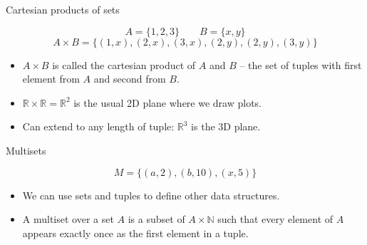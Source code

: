 \begin{frame}[fragile]{Cartesian products of sets}
  \begin{topdisp}
    $$A = \{1,2,3\} \qquad B = \{x,y\}$$
    $$A \times B = \{(1,x),(2,x),(3,x),(2,y),(2,y),(3,y)\}$$
  \end{topdisp}
  
  \begin{itemize}
    \item $A \times B$ is called the cartesian product of $A$ and $B$ -- the set of tuples with first element from $A$ and second from $B$.
    \item $\mathbb{R} \times \mathbb{R} = \mathbb{R}^2$ is the usual 2D plane where we draw plots.
    \item Can extend to any length of tuple: $\mathbb{R}^3$ is the 3D plane.
  \end{itemize}

  \begin{center}
    \hspace{5mm}
  \end{center}
\end{frame}

\begin{frame}[fragile]{Multisets}
  \begin{topdisp}
    $$M = \{(a, 2), (b, 10), (x,5) \}$$
  \end{topdisp}
  \begin{itemize}
    \setlength\itemsep{3mm}
    \item We can use sets and tuples to define other data structures.
    \item A multiset over a set $A$ is a subset of $A \times \mathbb{N}$ such that every element of $A$ appears exactly once as the first element in a tuple.
  \end{itemize}
\end{frame}



